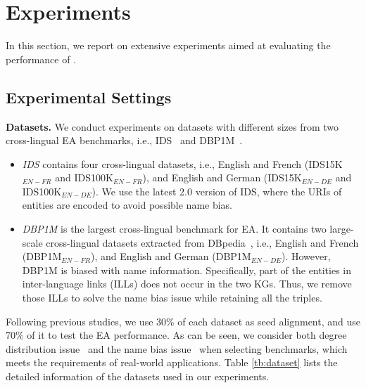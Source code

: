 
\section{Experiments}
\label{sec:exp}

In this section, we report on extensive experiments aimed at evaluating the performance of  \ClusterEA{}.


\vspace{-2mm}
\subsection{Experimental Settings}\label{sec:exp_setting}


\noindent
\textbf{Datasets.}
We conduct experiments on datasets with different sizes from two cross-lingual EA benchmarks, i.e., IDS~\cite{OpenEA2020VLDB} and DBP1M~\cite{LargeEA22}.
\begin{itemize}[topsep=0pt,itemsep=0pt,parsep=0pt,partopsep=0pt,leftmargin=*]
\item
\emph{IDS} contains four cross-lingual datasets, i.e., English and French (IDS15K$_{EN-FR}$ and IDS100K$_{EN-FR}$), and English and German (IDS15K$_{EN-DE}$ and IDS100K$_{EN-DE}$).  We use the latest 2.0 version of IDS, where the URIs of entities are encoded to avoid possible name bias.
\item \emph{DBP1M} is the largest cross-lingual benchmark for EA. It contains two large-scale cross-lingual datasets extracted from DBpedia~\cite{DBPedia}, i.e., English and French (DBP1M$_{EN-FR}$), and English and German (DBP1M$_{EN-DE}$).
However, DBP1M is biased with name information. Specifically, part of the entities in inter-language links (ILLs) does not occur in the two KGs. Thus, we remove those ILLs to solve the name bias issue while retaining all the triples.
\end{itemize}

Following previous studies, we use 30\% of each dataset as seed alignment, and use 70\% of it to test the EA performance. As can be seen, we consider both degree distribution issue~\cite{RSN19, OpenEA2020VLDB} and the name bias issue~\cite{AttrGNN20} when selecting benchmarks, which meets the requirements of real-world applications.
Table \ref{tb:dataset} lists the detailed information of the datasets used in our experiments.


